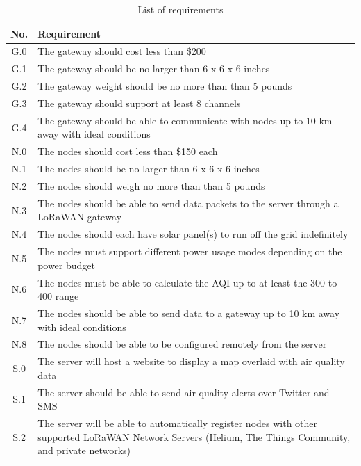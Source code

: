 \begin{table}[H]
\centering
\caption{List of requirements}
\begin{tabularx}{\linewidth}{|c|X|}
\hline
No. & Requirement \\
\hline\hline
G.0 & The gateway should cost less than \$200 \\\hline
G.1 & The gateway should be no larger than 6 x 6 x 6 inches \\\hline
G.2 & The gateway weight should be no more than than 5 pounds \\\hline
G.3 & The gateway should support at least 8 channels \\\hline
G.4 & The gateway should be able to communicate with nodes up to 10 km away with ideal conditions \\\hline

N.0 & The nodes should cost less than \$150 each \\\hline
N.1 & The nodes should be no larger than 6 x 6 x 6 inches \\\hline
N.2 & The nodes should weigh no more than than 5 pounds \\\hline
N.3 & The nodes should be able to send data packets to the server through a LoRaWAN gateway \\\hline
N.4 & The nodes should each have solar panel(s) to run off the grid indefinitely \\\hline
N.5 & The nodes must support different power usage modes depending on the power budget \\\hline
N.6 & The nodes must be able to calculate the AQI up to at least the 300 to 400 range \\\hline
N.7 & The nodes should be able to send data to a gateway up to 10 km away with ideal conditions \\\hline
N.8 & The nodes should be able to be configured remotely from the server \\\hline

S.0 & The server will host a website to display a map overlaid with air quality data \\\hline
S.1 & The server should be able to send air quality alerts over Twitter and SMS \\\hline
S.2 & The server will be able to automatically register nodes with other supported LoRaWAN Network Servers (Helium, The Things Community, and private networks) \\\hline
\end{tabularx}
\label{tab:list-of-requirements}
\end{table}

